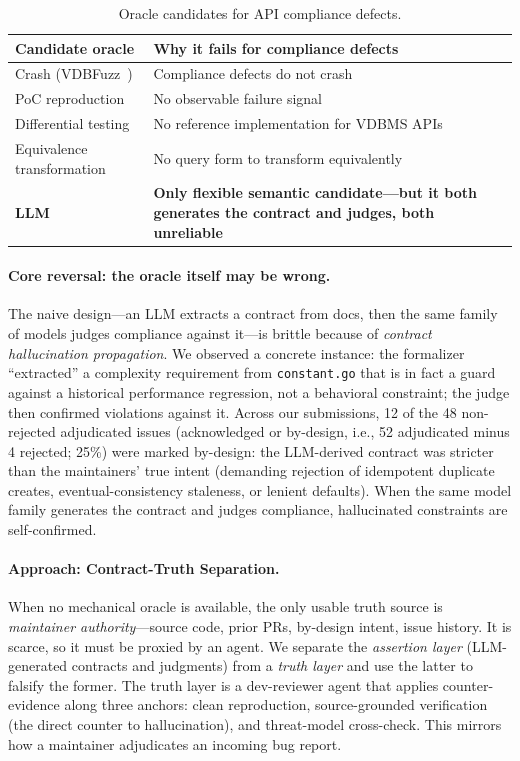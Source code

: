 \documentclass[sigconf]{acmart}
\begin{document}
\begin{table}[t]
\caption{Oracle candidates for API compliance defects.}
\label{tab:exclusion}
\small
\begin{tabular}{@{}p{}p{}@{}}
\toprule
Candidate oracle & Why it fails for compliance defects \\
\midrule
Crash (VDBFuzz~\cite{vdbfuzz26}) & Compliance defects do not crash \\
PoC reproduction & No observable failure signal \\
Differential testing & No reference implementation for VDBMS APIs \\
Equivalence transformation & No query form to transform equivalently \\
\textbf{LLM} & \textbf{Only flexible semantic candidate---but it both generates the contract and judges, both unreliable} \\
\bottomrule
\end{tabular}
\end{table}

\paragraph{Core reversal: the oracle itself may be wrong.}
The naive design---an LLM extracts a contract from docs, then the same family of models judges compliance against it---is brittle because of \emph{contract hallucination propagation}. We observed a concrete instance: the formalizer ``extracted'' a complexity requirement from \texttt{constant.go} that is in fact a guard against a historical performance regression, not a behavioral constraint; the judge then confirmed violations against it. Across our submissions, 12 of the 48 non-rejected adjudicated issues (acknowledged or by-design, i.e., 52 adjudicated minus 4 rejected; 25\%) were marked by-design: the LLM-derived contract was stricter than the maintainers' true intent (demanding rejection of idempotent duplicate creates, eventual-consistency staleness, or lenient defaults). When the same model family generates the contract and judges compliance, hallucinated constraints are self-confirmed.

\paragraph{Approach: Contract-Truth Separation.}
When no mechanical oracle is available, the only usable truth source is \emph{maintainer authority}---source code, prior PRs, by-design intent, issue history. It is scarce, so it must be proxied by an agent. We separate the \emph{assertion layer} (LLM-generated contracts and judgments) from a \emph{truth layer} and use the latter to falsify the former. The truth layer is a dev-reviewer agent that applies counter-evidence along three anchors: clean reproduction, source-grounded verification (the direct counter to hallucination), and threat-model cross-check. This mirrors how a maintainer adjudicates an incoming bug report.
\end{document}
